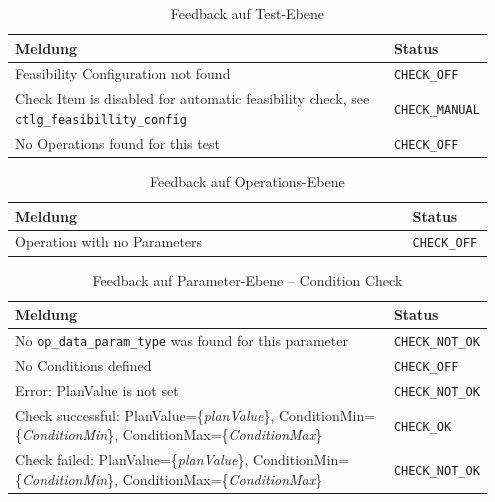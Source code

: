 \begin{table}[htb]
    \centering
    \footnotesize
    \renewcommand{\arraystretch}{1.1} %
    \setlength{\arrayrulewidth}{0.1pt} %
    \begin{tabular}{p{0.8\linewidth} p{0.15\linewidth}}
        \textbf{Meldung} & \textbf{Status} \\
        \midrule
        Feasibility Configuration not found & \texttt{CHECK\_OFF} \\
        \midrule
        Check Item is disabled for automatic feasibility check, see \texttt{ctlg\_feasibillity\_config} & \texttt{CHECK\_MANUAL} \\
        \midrule
        No Operations found for this test & \texttt{CHECK\_OFF} \\
        \bottomrule
    \end{tabular}
    \caption{Feedback auf Test-Ebene}
    \label{tab:feedback-test}
\end{table}


\begin{table}[htb]
    \centering
    \footnotesize
    \renewcommand{\arraystretch}{1.1}
    \begin{tabular}{p{0.8\linewidth} p{0.15\linewidth}}
        \textbf{Meldung} & \textbf{Status} \\
        \midrule
        Operation with no Parameters & \texttt{CHECK\_OFF} \\
        \bottomrule
    \end{tabular}
    \caption{Feedback auf Operations-Ebene}
    \label{tab:feedback-operation}
\end{table}


\begin{table}[htb]
    \centering
    \footnotesize
    \renewcommand{\arraystretch}{1.1}
    \begin{tabular}{p{0.8\linewidth} p{0.15\linewidth}}
        \textbf{Meldung} & \textbf{Status} \\
        \midrule
        No \texttt{op\_data\_param\_type} was found for this parameter & \texttt{CHECK\_NOT\_OK} \\
        \midrule
        No Conditions defined & \texttt{CHECK\_OFF} \\
        \midrule
        Error: PlanValue is not set & \texttt{CHECK\_NOT\_OK} \\
        \midrule
        Check successful: PlanValue=\{\textit{planValue}\}, ConditionMin=\{\textit{ConditionMin}\}, ConditionMax=\{\textit{ConditionMax}\} & \texttt{CHECK\_OK} \\
        \midrule
        Check failed: PlanValue=\{\textit{planValue}\}, ConditionMin=\{\textit{ConditionMin}\}, ConditionMax=\{\textit{ConditionMax}\} & \texttt{CHECK\_NOT\_OK} \\
        \bottomrule
    \end{tabular}
    \caption{Feedback auf Parameter-Ebene -- Condition Check}
    \label{tab:feedback-condition}
\end{table}


